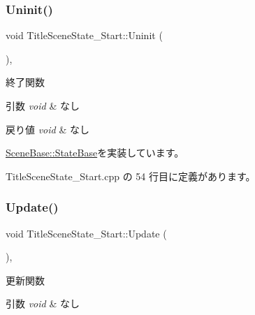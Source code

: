 \subsubsection{\texorpdfstring{Uninit()}{Uninit()}}
{\footnotesize\ttfamily void Title\+Scene\+State\+\_\+\+Start\+::\+Uninit (\begin{DoxyParamCaption}{ }\end{DoxyParamCaption})\hspace{0.3cm}{\ttfamily [override]}, {\ttfamily [virtual]}}



終了関数 


\begin{DoxyParams}{引数}
{\em void} & なし \\
\hline
\end{DoxyParams}

\begin{DoxyRetVals}{戻り値}
{\em void} & なし \\
\hline
\end{DoxyRetVals}


\mbox{\hyperlink{class_scene_base_1_1_state_base_a2763fa37e45b39bd8d3bbb735c76c59b}{Scene\+Base\+::\+State\+Base}}を実装しています。



 Title\+Scene\+State\+\_\+\+Start.\+cpp の 54 行目に定義があります。

\mbox{\label{class_title_scene_state___start_a2e98cf6810711b58766d7147168d02eb}} 
\subsubsection{\texorpdfstring{Update()}{Update()}}
{\footnotesize\ttfamily void Title\+Scene\+State\+\_\+\+Start\+::\+Update (\begin{DoxyParamCaption}{ }\end{DoxyParamCaption})\hspace{0.3cm}{\ttfamily [override]}, {\ttfamily [virtual]}}



更新関数 


\begin{DoxyParams}{引数}
{\em void} & なし \\
\hline
\end{DoxyParams}

